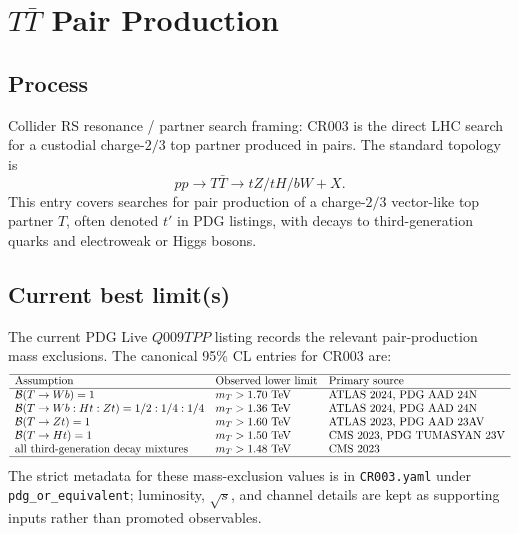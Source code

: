 
\section{\texorpdfstring{\(T\bar T\) Pair Production}{T Tbar Pair Production}}

\subsection*{Process}
Collider RS resonance / partner search framing: CR003 is the direct LHC
search for a custodial charge-\(2/3\) top partner produced in pairs.  The
standard topology is
\[
  pp\to T\bar T\to tZ/tH/bW+X .
\]
This entry covers searches for pair production of a charge-\(2/3\)
vector-like top partner \(T\), often denoted \(t'\) in PDG listings, with
decays to third-generation quarks and electroweak or Higgs bosons.

\subsection*{Current best limit(s)}
The current PDG Live \(Q009TPP\) listing records the relevant pair-production
mass exclusions.  The canonical 95\% CL entries for CR003 are:
\[
\begin{array}{lll}
\hline
\hbox{Assumption} & \hbox{Observed lower limit} & \hbox{Primary source} \\
\hline
{\cal B}(T\to Wb)=1 & m_T>1.70~\mathrm{TeV} &
\hbox{ATLAS 2024, PDG AAD 24N} \\
{\cal B}(T\to Wb:Ht:Zt)=1/2:1/4:1/4 & m_T>1.36~\mathrm{TeV} &
\hbox{ATLAS 2024, PDG AAD 24N} \\
{\cal B}(T\to Zt)=1 & m_T>1.60~\mathrm{TeV} &
\hbox{ATLAS 2023, PDG AAD 23AV} \\
{\cal B}(T\to Ht)=1 & m_T>1.50~\mathrm{TeV} &
\hbox{CMS 2023, PDG TUMASYAN 23V} \\
\hbox{all third-generation decay mixtures} & m_T>1.48~\mathrm{TeV} &
\hbox{CMS 2023} \\
\hline
\end{array}
\]
The strict metadata for these mass-exclusion values is in
\texttt{CR003.yaml} under \texttt{pdg\_or\_equivalent}; luminosity,
\(\sqrt{s}\), and channel details are kept as supporting inputs rather than
promoted observables.

